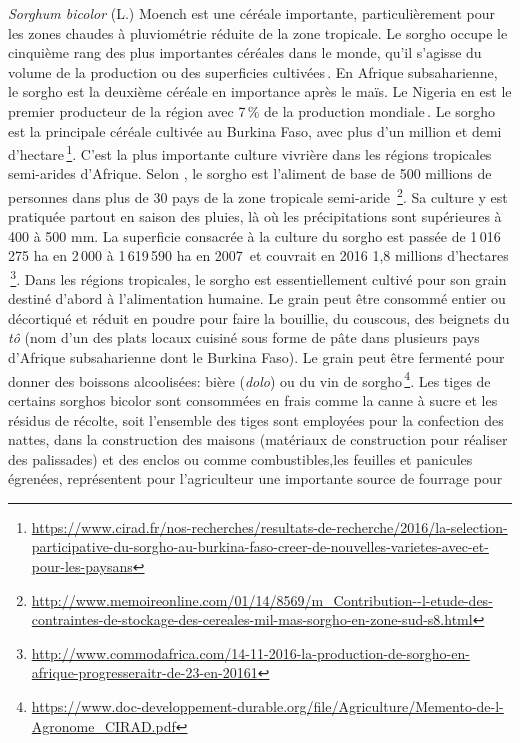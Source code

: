 \documentclass[a4paper,11pt]{article}
\begin{document}
\emph{Sorghum bicolor} (L.) Moench est une céréale importante,
particulièrement pour les zones chaudes à pluviométrie réduite de la
zone tropicale. Le sorgho occupe le cinquième rang des plus
importantes céréales dans le monde, qu’il s’agisse du volume de la
production ou des superficies cultivées\,\cite{FAOICRISAT_1997}. En
Afrique subsaharienne, le sorgho est la deuxième céréale en importance
après le maïs. Le Nigeria en est le premier producteur de la région
avec 7\,\% de la production mondiale\,\cite{FAO_1995}. Le sorgho est
la principale céréale cultivée au Burkina Faso, avec plus d’un million
et demi
d’hectare\,\footnote{\url{https://www.cirad.fr/nos-recherches/resultats-de-recherche/2016/la-selection-participative-du-sorgho-au-burkina-faso-creer-de-nouvelles-varietes-avec-et-pour-les-paysans}}. C’est
la plus importante culture vivrière dans les régions tropicales
semi-arides d’Afrique. Selon , le sorgho est
l’aliment de base de 500 millions de personnes dans plus de 30 pays de
la zone tropicale semi-aride
\,\footnote{\url{http://www.memoireonline.com/01/14/8569/m_Contribution--l-etude-des-contraintes-de-stockage-des-cereales-mil-mas-sorgho-en-zone-sud-s8.html}}.
Sa culture y est pratiquée partout en saison des pluies, là où les
précipitations sont supérieures à 400 à 500 mm. La superficie
consacrée à la culture du sorgho est passée de 1\,016\,275 ha en
2\,000 à 1\,619\,590 ha en 2007\,\cite{FAO_2007} et couvrait en 2016
1,8 millions d’hectares
\,\footnote{\url{http://www.commodafrica.com/14-11-2016-la-production-de-sorgho-en-afrique-progresseraitr-de-23-en-20161}}. Dans
les régions tropicales, le sorgho est essentiellement cultivé pour son
grain destiné d’abord à l’alimentation humaine. Le grain peut être
consommé entier ou décortiqué et réduit en poudre pour faire la
bouillie, du couscous, des beignets du \emph{tô} (nom d’un des plats
locaux cuisiné sous forme de pâte dans plusieurs pays d’Afrique
subsaharienne dont le Burkina Faso). Le grain peut être fermenté pour
donner des boissons alcoolisées: bière (\emph{dolo}) ou du vin de
sorgho\,\footnote{\url{https://www.doc-developpement-durable.org/file/Agriculture/Memento-de-l-Agronome_CIRAD.pdf}}.
Les tiges de certains sorghos bicolor sont consommées en frais comme
la canne à sucre et les résidus de récolte, soit l’ensemble des tiges
sont employées pour la confection des nattes, dans la construction des
maisons (matériaux de construction pour réaliser des palissades) et
des enclos ou comme combustibles,les feuilles et panicules égrenées,
représentent pour l’agriculteur une importante source de fourrage pour
\end{document}
